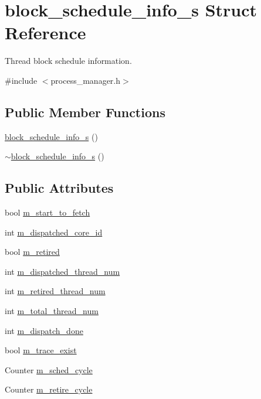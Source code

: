 \hypertarget{structblock__schedule__info__s}{
\section{block\_\-schedule\_\-info\_\-s Struct Reference}
\label{structblock__schedule__info__s}
}


Thread block schedule information.  




{\ttfamily \#include $<$process\_\-manager.h$>$}

\subsection*{Public Member Functions}
\begin{DoxyCompactItemize}
\item 
\hyperlink{structblock__schedule__info__s_ab78755e6bd30e94bff285a74b71586df}{block\_\-schedule\_\-info\_\-s} ()
\item 
\hyperlink{structblock__schedule__info__s_abda47e67bfa8f7a031dd8c6fda52d887}{$\sim$block\_\-schedule\_\-info\_\-s} ()
\end{DoxyCompactItemize}
\subsection*{Public Attributes}
\begin{DoxyCompactItemize}
\item 
bool \hyperlink{structblock__schedule__info__s_a2a94ce096712373fc57cde8da942cb28}{m\_\-start\_\-to\_\-fetch}
\item 
int \hyperlink{structblock__schedule__info__s_af9ed930b90d0ca42f0311528a8186f39}{m\_\-dispatched\_\-core\_\-id}
\item 
bool \hyperlink{structblock__schedule__info__s_a639fb673552f73fd90dccb4ae6c5ea1c}{m\_\-retired}
\item 
int \hyperlink{structblock__schedule__info__s_af3b66bd84d411c90fe2683bf77394683}{m\_\-dispatched\_\-thread\_\-num}
\item 
int \hyperlink{structblock__schedule__info__s_a7194b000c4d81d80610eeec597e90e1f}{m\_\-retired\_\-thread\_\-num}
\item 
int \hyperlink{structblock__schedule__info__s_abbc67ac8b7a9a0bdc964d6b9a5a4c8d0}{m\_\-total\_\-thread\_\-num}
\item 
int \hyperlink{structblock__schedule__info__s_a78744ab215866834ea3fd99a78e6758f}{m\_\-dispatch\_\-done}
\item 
bool \hyperlink{structblock__schedule__info__s_a82e2fd882d6e6269a567e2d421bf0f27}{m\_\-trace\_\-exist}
\item 
Counter \hyperlink{structblock__schedule__info__s_ad967529ea12c192c606882f5e129ed0a}{m\_\-sched\_\-cycle}
\item 
Counter \hyperlink{structblock__schedule__info__s_ac2d0055e1b2764b0c54c92ee51094e8e}{m\_\-retire\_\-cycle}
\end{DoxyCompactItemize}



